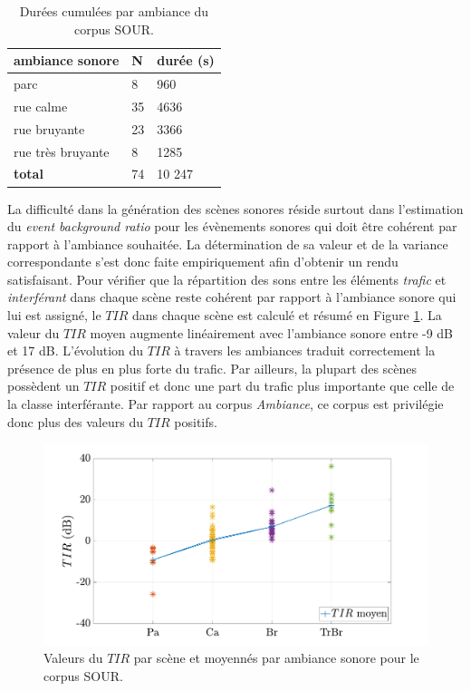 \begin{table}[h!]
\caption{Durées cumulées par ambiance du corpus SOUR.}
\label{tab:resume_sour}
\centering
\begin{tabular}{L{3cm}C{2cm}C{2cm}}
\textbf{ambiance sonore}  & \textbf{N} & \textbf{durée (s)}  \\ \toprule
parc & 8 & 960 \\
rue calme & 35 & 4636 \\
rue bruyante & 23 & 3366 \\
rue très bruyante & 8 & 1285 \\ \midrule
\textbf{total} & 74 & 10 247 \\ \bottomrule
\end{tabular}
\end{table}

La difficulté dans la génération des scènes sonores réside surtout dans l'estimation du \textit{event background ratio} pour les évènements sonores qui doit être cohérent par rapport à l'ambiance souhaitée. La détermination de sa valeur et de la variance correspondante s'est donc faite empiriquement afin d'obtenir un rendu satisfaisant. Pour vérifier que la répartition des sons entre les éléments \textit{trafic} et \textit{interférant} dans chaque scène reste cohérent par rapport à l'ambiance sonore qui lui est assigné, le $TIR$ dans chaque scène est calculé et résumé en Figure \ref{fig:tir_grafic}. La valeur du $TIR$ moyen augmente linéairement avec l'ambiance sonore entre -9 dB et 17 dB. L'évolution du $TIR$ à travers les ambiances traduit correctement la présence de plus en plus forte du trafic. Par ailleurs, la plupart des scènes possèdent un $TIR$ positif et donc une part du trafic plus importante que celle de la classe interférante. Par rapport au corpus \textit{Ambiance}, ce corpus est privilégie donc plus des valeurs du $TIR$ positifs. 

\begin{figure}[h]
\centering
\includegraphics[width=.8\linewidth]{./figures/grafic/TIR_grafic.pdf}
\caption{Valeurs du $TIR$ par scène et moyennés par ambiance sonore pour le corpus SOUR.}
\label{fig:tir_grafic}
\end{figure}

